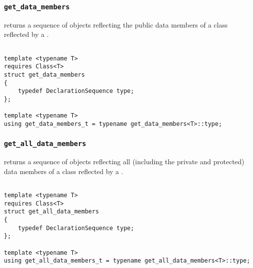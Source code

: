 
\subsubsection{\texttt{get\_data\_members}}

returns a sequence of objects reflecting the public data members of a class reflected by a .

\begin{verbatim}

template <typename T>
requires Class<T>
struct get_data_members
{
	typedef DeclarationSequence type;
};
	
template <typename T>
using get_data_members_t = typename get_data_members<T>::type;

\end{verbatim}

\subsubsection{\texttt{get\_all\_data\_members}}

returns a sequence of objects reflecting all    (including the private and protected)   data members of a class reflected by a .

\begin{verbatim}

template <typename T>
requires Class<T>
struct get_all_data_members
{
	typedef DeclarationSequence type;
};
	
template <typename T>
using get_all_data_members_t = typename get_all_data_members<T>::type;

\end{verbatim}
